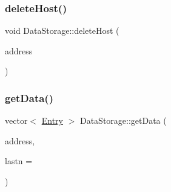 \subsubsection{\texorpdfstring{delete\+Host()}{deleteHost()}}
{\footnotesize\ttfamily void Data\+Storage\+::delete\+Host (\begin{DoxyParamCaption}\item[{quint32}]{address }\end{DoxyParamCaption})}

\mbox{\label{class_data_storage_a716fe9bd808cb8ea9f0ef153bf01a633}} 
\subsubsection{\texorpdfstring{get\+Data()}{getData()}}
{\footnotesize\ttfamily vector$<$ \mbox{\hyperlink{struct_entry}{Entry}} $>$ Data\+Storage\+::get\+Data (\begin{DoxyParamCaption}\item[{Q\+Host\+Address}]{address,  }\item[{unsigned int}]{lastn = {} }\end{DoxyParamCaption})}


